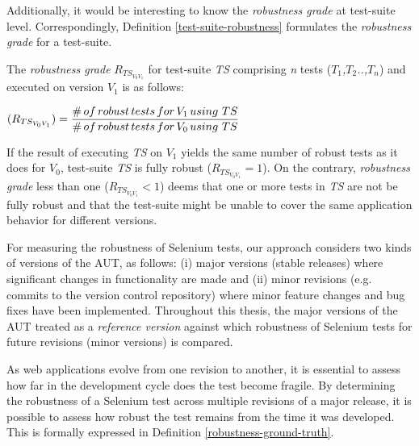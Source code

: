 Additionally, it would be interesting to know the \textit{
robustness grade} at test-suite level. Correspondingly, Definition \ref{test-suite-robustness} formulates the \textit{
robustness grade} for a test-suite.

\theoremstyle{definition}
\begin{definition}{The \textit{robustness grade} $R_{TS_{V_{0}V_{1}}}$ for test-suite \textit{TS} comprising \textit{n} tests (\textit{$T_1$,$T_2$..,$T_n$}) and executed on version \textit{$V_{1}$} is as follows:}
\vspace{0.5cm}
\begin{center}
$(R_{TS_{V_{0}V_{1}}}) = \displaystyle \frac{\#\thinspace of \thinspace robust \thinspace tests \thinspace for \thinspace V_{1} \thinspace using \thinspace \thinspace TS}{\# \thinspace of \thinspace robust \thinspace tests \thinspace for  \thinspace V_{0} \thinspace using \thinspace \thinspace TS}$ \normalsize
\end{center}
\label{test-suite-robustness}
\end{definition}

If the result of executing \textit{TS} on \textit{$V_{1}$} yields the same number of robust tests as it does for \textit{$V_{0}$}, test-suite \textit{TS} is fully robust ($R_{TS_{V_{0}V_{1}}} =1$). On the contrary, \textit{
robustness grade} less than one ($R_{TS_{V_{0}V_{1}}} < 1$) deems that one or more tests in \textit{TS} are not be fully robust and that the test-suite might be unable to cover the same application behavior for different versions. 

For measuring the robustness of Selenium tests, our approach considers two kinds of versions of the AUT, as follows: (i) major versions (stable releases) where significant changes in functionality are made and (ii) minor revisions (e.g. commits to the version control repository) where minor feature changes and bug fixes have been implemented. Throughout this thesis, the major versions of the AUT treated as a \textit{reference version} against which robustness of Selenium tests for future revisions (minor versions) is compared. 


As web applications evolve from one revision to another, it is essential to assess how far in the development cycle does the test become fragile. By determining the robustness of a Selenium test across multiple revisions of a major release, it is possible to assess how robust the test remains from the time it was developed. This is formally expressed in Definition \ref{robustness-ground-truth}. 

